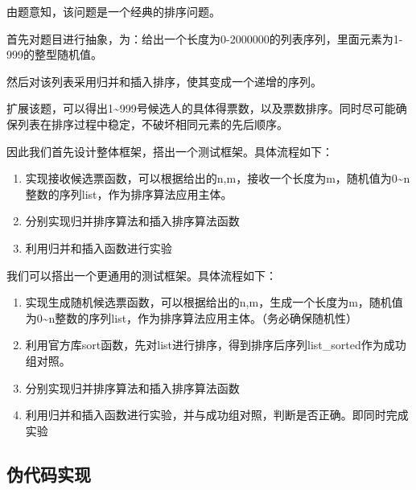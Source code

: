 \documentclass[11pt]{article}
\providecommand{\tightlist}{%
      \setlength{\itemsep}{0pt}\setlength{\parskip}{0pt}}
\begin{document}
由题意知，该问题是一个经典的排序问题。

首先对题目进行抽象，为：给出一个长度为0-2000000的列表序列，里面元素为1-999的整型随机值。

然后对该列表采用归并和插入排序，使其变成一个递增的序列。

扩展该题，可以得出1\textasciitilde999号候选人的具体得票数，以及票数排序。同时尽可能确保列表在排序过程中稳定，不破坏相同元素的先后顺序。

因此我们首先设计整体框架，搭出一个测试框架。具体流程如下：

\begin{enumerate}
\def\labelenumi{\arabic{enumi}.}
\tightlist
\item
  实现接收候选票函数，可以根据给出的n,m，接收一个长度为m，随机值为0\textasciitilde n整数的序列list，作为排序算法应用主体。
\item
  分别实现归并排序算法和插入排序算法函数
\item
  利用归并和插入函数进行实验
\end{enumerate}

我们可以搭出一个更通用的测试框架。具体流程如下：

\begin{enumerate}
\def\labelenumi{\arabic{enumi}.}
\tightlist
\item
  实现生成随机候选票函数，可以根据给出的n,m，生成一个长度为m，随机值为0\textasciitilde n整数的序列list，作为排序算法应用主体。（务必确保随机性）
\item
  利用官方库sort函数，先对list进行排序，得到排序后序列list\_sorted作为成功组对照。
\item
  分别实现归并排序算法和插入排序算法函数
\item
  利用归并和插入函数进行实验，并与成功组对照，判断是否正确。即同时完成实验
\end{enumerate}

\hypertarget{ux4f2aux4ee3ux7801ux5b9eux73b0}{%
\subsection{伪代码实现}\label{ux4f2aux4ee3ux7801ux5b9eux73b0}}
\end{document}
